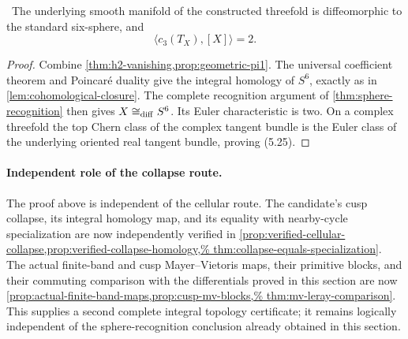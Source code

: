 \begin{corollary}
\label{cor:candidate-sphere}
\Verified\ The underlying smooth manifold of the constructed threefold is
diffeomorphic to the standard six-sphere, and
\[
 \langle c_3(T_X),[X]\rangle=2.
\tag{5.25}
\]
\end{corollary}

\begin{proof}
Combine \cref{thm:h2-vanishing,prop:geometric-pi1}.  The universal
coefficient theorem and Poincar\'e duality give the integral homology of
\(S^6\), exactly as in \cref{lem:cohomological-closure}.  The complete
recognition argument of \cref{thm:sphere-recognition} then gives
\(X\cong_{\rm diff}S^6\).  Its Euler characteristic is two.  On a complex
threefold the top Chern class of the complex tangent bundle is the Euler
class of the underlying oriented real tangent bundle, proving (5.25).
\end{proof}

\paragraph{Independent role of the collapse route.}
The proof above is independent of the cellular route.  The candidate's cusp
collapse, its integral homology map, and its equality with nearby-cycle
specialization are now independently verified in
\cref{prop:verified-cellular-collapse,prop:verified-collapse-homology,%
thm:collapse-equals-specialization}.  The actual finite-band and cusp
Mayer--Vietoris maps, their primitive blocks, and their commuting comparison
with the differentials proved in this section are now
\cref{prop:actual-finite-band-maps,prop:cusp-mv-blocks,%
thm:mv-leray-comparison}.  This supplies a second complete integral topology
certificate; it remains logically independent of the sphere-recognition
conclusion already obtained in this section.
